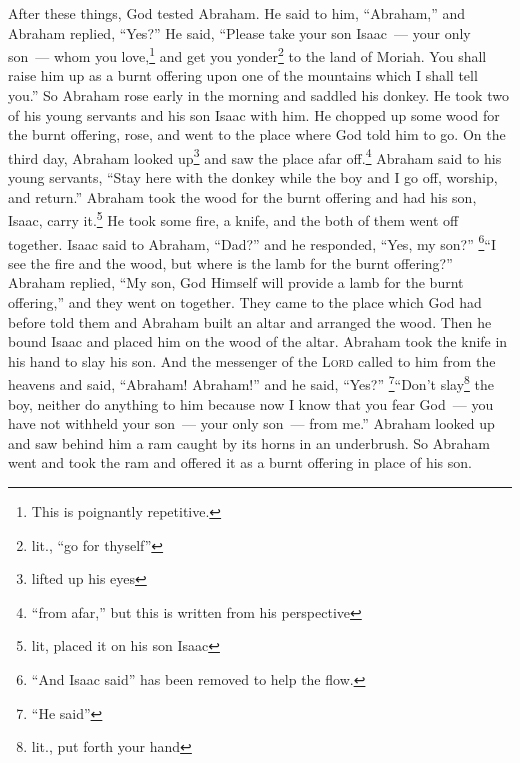 
\begin{inparaenum}
     After these things, God tested Abraham. He said to him, ``Abraham,'' and Abraham replied, ``Yes?''%
     He said, ``Please take your son Isaac~--- your only son~--- whom you love,\footnote{This is poignantly repetitive.} and get you yonder\footnote{lit., ``go for thyself''} to the land of Moriah. You shall raise him up as a burnt offering upon one of the mountains which I shall tell you.''%
     So Abraham rose early in the morning and saddled his donkey. He took two of his young servants and his son Isaac with him. He chopped up some wood for the burnt offering, rose, and went to the place where God told him to go.%
     On the third day, Abraham looked up\footnote{lifted up his eyes} and saw the place afar off.\footnote{``from afar,'' but this is written from his perspective}%
     Abraham said to his young servants, ``Stay here with the donkey while the boy and I go off, worship, and return.''%
     Abraham took the wood for the burnt offering and had his son, Isaac, carry it.\footnote{lit, placed it on his son Isaac} He took some fire, a knife, and the both of them went off together.%
     Isaac said to Abraham, ``Dad?'' and he responded, ``Yes, my son?'' \footnote{``And Isaac said'' has been removed to help the flow.}``I see the fire and the wood, but where is the lamb for the burnt offering?''%
     Abraham replied, ``My son, God Himself will provide a lamb for the burnt offering,'' and they went on together.%
     They came to the place which God had before told them and Abraham built an altar and arranged the wood. Then he bound Isaac and placed him on the wood of the altar.%
     Abraham took the knife in his hand to slay his son.%
     And the messenger of the \textsc{Lord} called to him from the heavens and said, ``Abraham! Abraham!'' and he said, ``Yes?''%
     \footnote{``He said''}``Don't slay\footnote{lit., put forth your hand} the boy, neither do anything to him because now I know that you fear God~--- you have not withheld your son~--- your only son~--- from me.''%
     Abraham looked up and saw behind him a ram caught by its horns in an underbrush. So Abraham went and took the ram and offered it as a burnt offering in place of his son.%

\end{inparaenum}
